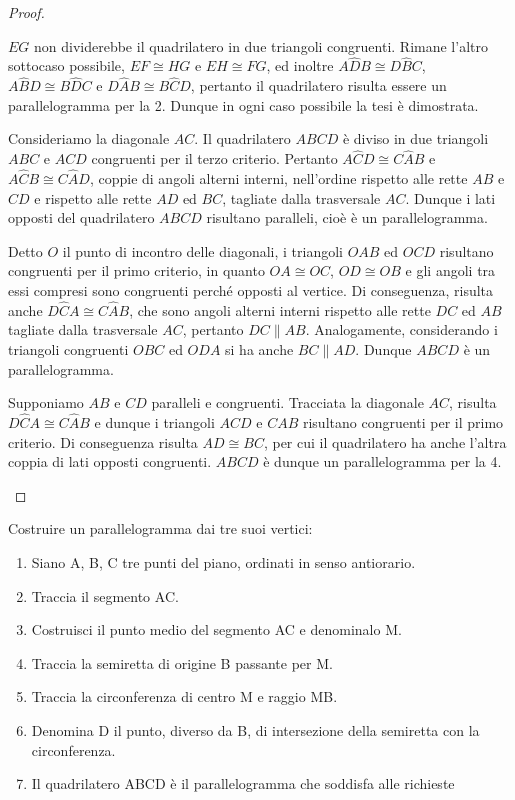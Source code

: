 \begin{proof}
\begin{enumerate*}
    \(EG\) non dividerebbe il quadrilatero in due triangoli congruenti. 
    Rimane l'altro sottocaso possibile, \(EF\cong HG\) e \(EH\cong FG\), ed 
    inoltre \(A\widehat{D}B\cong D\widehat{B}C\), \(A\widehat{B}D\cong 
    B\widehat{D}C\) e \(D\widehat{A}B\cong B\widehat{C}D\), pertanto il 
    quadrilatero risulta essere un parallelogramma per la 2. Dunque in 
    ogni caso possibile la tesi è dimostrata.
    \item Consideriamo la diagonale \(AC\). Il quadrilatero \(ABCD\) è diviso 
    in due triangoli \(ABC\) e \(ACD\) congruenti per il terzo criterio. 
    Pertanto \(A\widehat{C}D\cong C\widehat{A}B\) e \(A\widehat{C}B\cong 
    C\widehat{A}D\), coppie di angoli alterni interni, nell'ordine 
    rispetto alle rette \(AB\) e \(CD\) e rispetto alle rette \(AD\) ed \(BC\), 
    tagliate dalla trasversale \(AC\). Dunque i lati opposti del 
    quadrilatero \(ABCD\) risultano paralleli, cioè è un parallelogramma.
    \item Detto \(O\) il punto di incontro delle diagonali, i triangoli 
    \(OAB\) ed \(OCD\) risultano congruenti per il primo criterio, in quanto 
    \(OA\cong OC\), \(OD\cong OB\) e gli angoli tra essi compresi sono 
    congruenti perché opposti al vertice. Di conseguenza, risulta anche 
    \(D\widehat{C}A\cong C\widehat{A}B\), che sono angoli alterni interni 
    rispetto alle rette \(DC\) ed \(AB\) tagliate dalla trasversale \(AC\), 
    pertanto \(DC\parallel AB\). Analogamente, considerando i triangoli 
    congruenti \(OBC\) ed \(ODA\) si ha anche \(BC\parallel AD\). Dunque \(ABCD\) 
    è un parallelogramma.
    \item Supponiamo \(AB\) e \(CD\) paralleli e congruenti. Tracciata la 
    diagonale \(AC\), risulta \(D\widehat{C}A\cong C\widehat{A}B\) e dunque i 
    triangoli \(ACD\) e \(CAB\) risultano congruenti per il primo criterio. 
    Di conseguenza risulta \(AD\cong BC\), per cui il quadrilatero ha anche 
    l'altra coppia di lati opposti congruenti. \(ABCD\) è dunque un 
    parallelogramma per la 4.
  \end{enumerate*}
\end{proof}


\begin{procedura}
Costruire un parallelogramma dai tre suoi vertici:
\begin{enumerate} [nosep]
\item 
Siano A, B, C tre punti del piano, ordinati in senso antiorario.
\item 
Traccia il segmento AC.
\item 
Costruisci il punto medio del segmento AC e denominalo M.
\item 
Traccia la semiretta di origine B passante per M.
\item 
Tracci­a la circonferenza di centro M e raggio MB.
\item 
Denomina D il punto,  diverso da B, di intersezione della semiretta con la 
circonferenza.
\item 
Il quadrilatero ABCD è il parallelogramma che soddisfa alle richieste
\end{enumerate}
\end{procedura}


